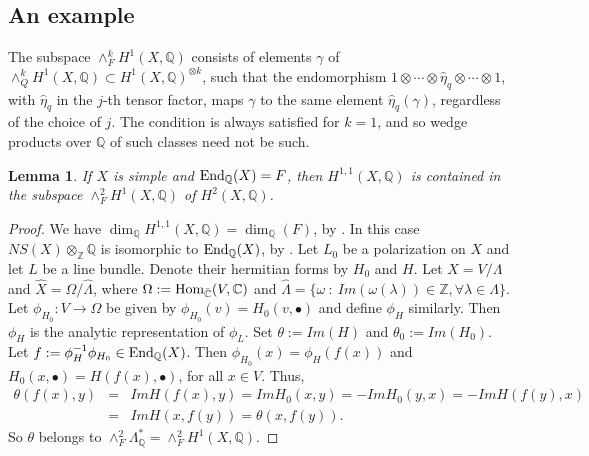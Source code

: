 \documentclass[12pt]{amsart}
\numberwithin{equation}{subsection}
\theoremstyle{plain}
\newtheorem{lem}[thm]{Lemma}
\theoremstyle{definition}
\newtheorem{example}[thm]{Example}
\newcommand{\CC}{{\mathbb C}}
\newcommand{\QQ}{{\mathbb Q}}
\newcommand{\ZZ}{{\mathbb Z}}
\newcommand{\Hom}{{\rm Hom}}
\newcommand{\End}{{\rm End}}
\begin{document}
{%
%
\subsection{An example}
\label{sec-example-isometry-g-0}


The subspace $\wedge_F^kH^1(X,\QQ)$ consists of elements $\gamma$ of $\wedge_Q^kH^1(X,\QQ)\subset H^1(X,\QQ)^{\otimes k}$, such that the endomorphism 
 $1 \otimes \cdots \otimes \hat{\eta}_q \otimes \cdots \otimes 1$, with $\hat{\eta}_q$ in the $j$-th tensor factor, maps $\gamma$ to the same element $\hat{\eta}_q(\gamma)$, regardless of the choice of $j$. The condition is always satisfied for $k=1$, and so wedge products over $\QQ$ of such classes need not be such.

\begin{lem}
\label{lemma-wedge-2-F-H-1-contains-an-ample-class}
If $X$ is simple and $\End_\QQ(X)=F$, then 
$H^{1,1}(X,\QQ)$ is contained in the subspace $\wedge^2_FH^1(X,\QQ)$ of $H^2(X,\QQ)$. 
\end{lem}

\begin{proof}
We have 
$\dim_\QQ H^{1,1}(X,\QQ)=\dim_\QQ(F)$, by
\cite[Prop. 5.5.7]{BL}. In this case $NS(X)\otimes_\ZZ\QQ$ is isomorphic to $\End_\QQ(X)$, by 
\cite[Prop. 5.2.1]{BL}. Let $L_0$ be a polarization on $X$ and let $L$ be a line bundle.
Denote their hermitian forms by $H_0$ and $H$. Let $X=V/\Lambda$ and $\hat{X}=\Omega/\hat{\Lambda}$, where $\Omega:=\Hom_{\bar{\CC}}(V,\CC)$ and
$\hat{\Lambda}=\{\omega \ : \ Im(\omega(\lambda))\in\ZZ, \forall \lambda\in\Lambda\}$.
Let $\phi_{H_0}:V\rightarrow\Omega$ be given by $\phi_{H_0}(v)=H_0(v,\bullet)$ and define $\phi_H$ similarly. Then $\phi_H$ is the analytic representation of $\phi_L$.
Set $\theta:=Im(H)$ and $\theta_0:=Im(H_0)$. Let $f:=\phi_H^{-1}\phi_{H_0}\in\End_\QQ(X)$.
Then $\phi_{H_0}(x)=\phi_H(f(x))$ and $H_0(x,\bullet)=H(f(x),\bullet)$, for all $x\in V$. Thus,
\begin{eqnarray*}
\theta(f(x),y)&=&Im H(f(x),y)=Im H_0(x,y)=-Im H_0(y,x) = -Im H(f(y),x)
\\
&=&Im H(x,f(y))=\theta(x,f(y)).
\end{eqnarray*}
So $\theta$ belongs to $\wedge^2_F \Lambda_\QQ^*=\wedge^2_FH^1(X,\QQ)$.
\end{proof}

}
\end{document}

